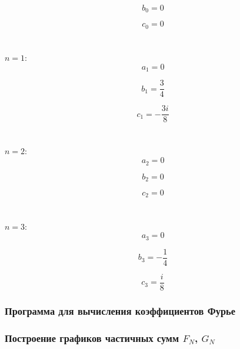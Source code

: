 \documentclass[a5paper, 10pt]{article}
\theoremstyle{definition}
\theoremstyle{plain}
\theoremstyle{remark}
\begin{document}
\begin{equation}
b_0  = 0
\end{equation}

\begin{equation}
c_0  = 0
\end{equation}
\\
\\

$n = 1:$
\begin{equation}
a_1 = 0
\end{equation}

\begin{equation}
b_1 = \frac{3}{4}
\end{equation}

\begin{equation}
c_1  = - \frac{3 i  }{8}
\end{equation}
\\
\\

$n = 2:$
\begin{equation}
a_2  = 0
\end{equation}

\begin{equation}
b_2 = 0
\end{equation}

\begin{equation}
c_2  = 0
\end{equation}
\\
\\

$n = 3:$
\begin{equation}
a_3  = 0
\end{equation}

\begin{equation}
b_3 = -\frac{1}{4}
\end{equation}

\begin{equation}
c_3  = \frac{i}{8}
\end{equation}


\subsubsection{Программа для вычисления коэффициентов Фурье}


\subsubsection{Построение графиков частичных сумм $F_N$, $G_N$}
\end{document}
